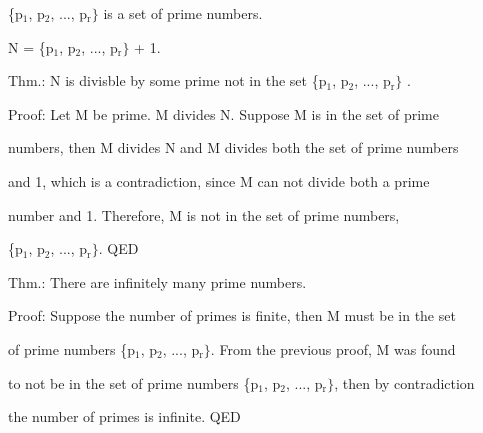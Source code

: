 \documentclass[12pt]{article}
\begin{document}
\{p$_{\text{1}}$, p$_{\text{2}}$, ..., p$_{\text{r}}\}$ is a set of prime numbers.

N = \{p$_{\text{1}}$, p$_{\text{2}}$, ..., p$_{\text{r}}\}$ + 1. \newline

Thm.: N is divisble by some prime not in the set \{p$_{\text{1}}$, p$_{\text{2}}$, ..., p$_{\text{r}}\}$ .

Proof: Let M be prime. M divides N. Suppose M is in the set of prime 

numbers, then M divides N and M divides both the set of prime numbers 

and 1, which is a contradiction, since M can not divide both a prime 

number and 1. Therefore, M is not in the set of prime numbers, 

\{p$_{\text{1}}$, p$_{\text{2}}$, ..., p$_{\text{r}}\}$. QED \newline 

Thm.: There are infinitely many prime numbers.

Proof: Suppose the number of primes is finite, then M must be in the set 

of prime numbers \{p$_{\text{1}}$, p$_{\text{2}}$, ..., p$_{\text{r}}\}$. From the previous proof, M was found 

to not be in the set of prime numbers \{p$_{\text{1}}$, p$_{\text{2}}$, ..., p$_{\text{r}}\}$, then by contradiction

the number of primes is infinite. QED
\end{document}

